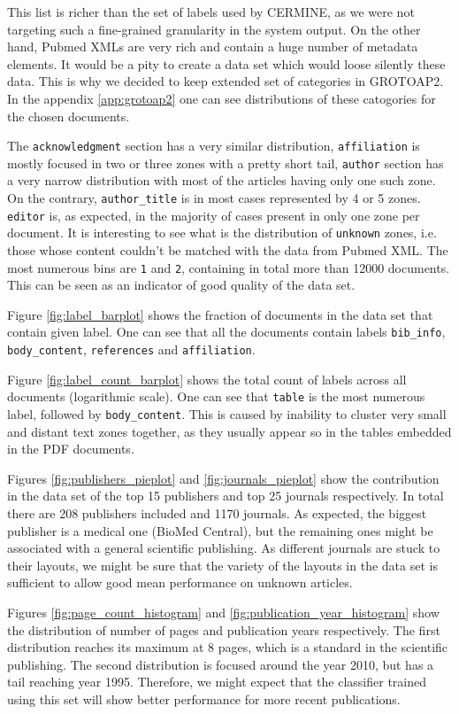 This list is richer than the set of labels used by CERMINE, as we were not targeting such a fine-grained granularity in the system output. On the other hand, Pubmed XMLs are very rich and contain a huge number of metadata elements. It would be a pity to create a data set which would loose silently these data. This is why we decided to keep extended set of categories in GROTOAP2. In the appendix \ref{app:grotoap2} one can see distributions of these catogories for the chosen documents.

The \verb+acknowledgment+ section has a very similar distribution, \verb+affiliation+ is mostly focused in two or three zones with a pretty short tail, \verb+author+ section has a very narrow distribution with most of the articles having only one such zone. On the contrary, \verb+author_title+ is in most cases represented by 4 or 5 zones. \verb+editor+ is, as expected, in the majority of cases present in only one zone per document. It is interesting to see what is the distribution of \verb+unknown+ zones, i.e. those whose content couldn't be matched with the data from Pubmed XML. The most numerous bins are \verb+1+ and \verb+2+, containing in total more than 12000 documents. This can be seen as an indicator of good quality of the data set.

Figure \ref{fig:label_barplot} shows the fraction of documents in the data set that contain given label. One can see that all the documents contain labels \verb+bib_info+, \verb+body_content+, \verb+references+ and \verb+affiliation+.

Figure \ref{fig:label_count_barplot} shows the total count of labels across all documents (logarithmic scale). One can see that \verb+table+ is the most numerous label, followed by \verb+body_content+. This is caused by inability to cluster very small and distant text zones together, as they usually appear so in the tables embedded in the PDF documents.

Figures \ref{fig:publishers_pieplot} and \ref{fig:journals_pieplot} show the contribution in the data set of the top 15 publishers and top 25 journals respectively. In total there are 208 publishers included and 1170 journals. As expected, the biggest publisher is a medical one (BioMed Central), but the remaining ones might be associated with a general scientific publishing. As different journals are stuck to their layouts, we might be sure that the variety of the layouts in the data set is sufficient to allow good mean performance on unknown articles.

Figures \ref{fig:page_count_histogram} and \ref{fig:publication_year_histogram} show the distribution of number of pages and publication years respectively. The first distribution reaches its maximum at 8 pages, which is a standard in the scientific publishing. The second distribution is focused around the year 2010, but has a tail reaching year 1995. Therefore, we might expect that the classifier trained using this set will show better performance for more recent publications.

